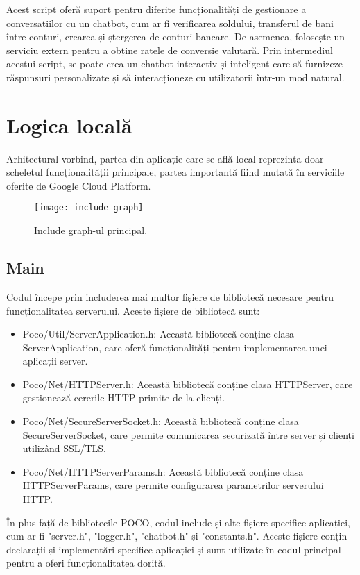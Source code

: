Acest script oferă suport pentru diferite funcționalități de gestionare a conversațiilor cu un chatbot, cum ar fi verificarea soldului, transferul de bani între conturi, crearea și ștergerea de conturi bancare. De asemenea, folosește un serviciu extern pentru a obține ratele de conversie valutară. Prin intermediul acestui script, se poate crea un chatbot interactiv și inteligent care să furnizeze răspunsuri personalizate și să interacționeze cu utilizatorii într-un mod natural.

\section{Logica locală}

Arhitectural vorbind, partea din aplicație care se află local reprezinta doar scheletul funcționalității principale, partea importantă fiind mutată în serviciile oferite de Google Cloud Platform.

\begin{figure}[h]
  \centering
  \texttt{[image: include-graph]}
  \caption{Include graph-ul principal.}
  \label{fig:includeGraph}
\end{figure}

\subsection{Main}

Codul începe prin includerea mai multor fișiere de bibliotecă necesare pentru funcționalitatea serverului. Aceste fișiere de bibliotecă sunt:

\begin{itemize}
  \item Poco/Util/ServerApplication.h: Această bibliotecă conține clasa ServerApplication, care oferă funcționalități pentru implementarea unei aplicații server.
  \item Poco/Net/HTTPServer.h: Această bibliotecă conține clasa HTTPServer, care gestionează cererile HTTP primite de la clienți.
  \item Poco/Net/SecureServerSocket.h: Această bibliotecă conține clasa SecureServerSocket, care permite comunicarea securizată între server și clienți utilizând SSL/TLS.
  \item Poco/Net/HTTPServerParams.h: Această bibliotecă conține clasa HTTPServerParams, care permite configurarea parametrilor serverului HTTP.
\end{itemize}

În plus față de bibliotecile POCO, codul include și alte fișiere specifice aplicației, cum ar fi "server.h", "logger.h", "chatbot.h" și "constants.h". Aceste fișiere conțin declarații și implementări specifice aplicației și sunt utilizate în codul principal pentru a oferi funcționalitatea dorită.

